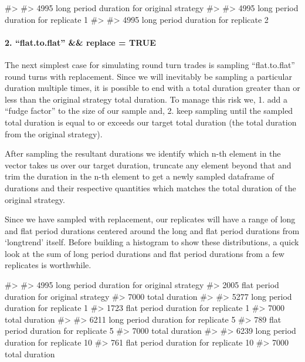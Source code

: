 \begin{Schunk}
\begin{Soutput}
#> 
#>  4995 long period duration for original strategy 
#>  
#>  4995 long period duration for replicate 1 
#>  
#>  4995 long period duration for replicate 2
\end{Soutput}
\end{Schunk}

\hypertarget{flat.to.flat-replace-true}{%
\paragraph{2. ``flat.to.flat'' \&\& replace =
TRUE}\label{flat.to.flat-replace-true}}

The next simplest case for simulating round turn trades is sampling
``flat.to.flat'' round turns with replacement. Since we will inevitably
be sampling a particular duration multiple times, it is possible to end
with a total duration greater than or less than the original strategy
total duration. To manage this risk we, 1. add a ``fudge factor'' to the
size of our sample and, 2. keep sampling until the sampled total
duration is equal to or exceeds our target total duration (the total
duration from the original strategy).

After sampling the resultant durations we identify which n-th element in
the vector takes us over our target duration, truncate any element
beyond that and trim the duration in the n-th element to get a newly
sampled dataframe of durations and their respective quantities which
matches the total duration of the original strategy.

Since we have sampled with replacement, our replicates will have a range
of long and flat period durations centered around the long and flat
period durations from `longtrend' itself. Before building a histogram to
show these distributions, a quick look at the sum of long period
durations and flat period durations from a few replicates is worthwhile.

\begin{Schunk}
\begin{Soutput}
#> 
#>  4995 long period duration for original strategy 
#>  2005 flat period duration for original strategy 
#>  7000 total duration 
#>  
#>  5277 long period duration for replicate 1 
#>  1723 flat period duration for replicate 1 
#>  7000 total duration 
#>  
#>  6211 long period duration for replicate 5 
#>  789 flat period duration for replicate 5 
#>  7000 total duration 
#>  
#>  6239 long period duration for replicate 10 
#>  761 flat period duration for replicate 10 
#>  7000 total duration
\end{Soutput}
\end{Schunk}

